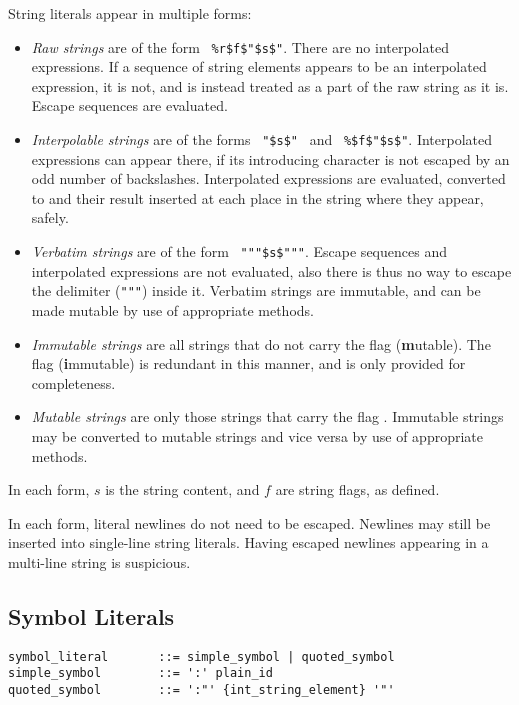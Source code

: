 String literals appear in multiple forms:
\begin{itemize}
  \item {\em Raw strings} are of the form ~\lstinline!%r$f$"$s$"!. There are no interpolated expressions. If a sequence of string elements appears to be an interpolated expression, it is not, and is instead treated as a part of the raw string as it is. Escape sequences are evaluated. 
  \item {\em Interpolable strings} are of the forms ~\lstinline!"$s$"!~ and ~\lstinline!%$f$"$s$"!. Interpolated expressions can appear there, if its introducing character is not escaped by an odd number of backslashes. Interpolated expressions are evaluated, converted to  and their result inserted at each place in the string where they appear, safely. 
  \item {\em Verbatim strings} are of the form ~\lstinline!"""$s$"""!. Escape sequences and interpolated expressions are not evaluated, also there is thus no way to escape the delimiter (\lstinline!"""!) inside it. Verbatim strings are immutable, and can be made mutable by use of appropriate methods. 
  \item {\em Immutable strings} are all strings that do not carry the flag  (\textbf{m}utable). The flag  (\textbf{i}mmutable) is redundant in this manner, and is only provided for completeness. 
  \item {\em Mutable strings} are only those strings that carry the flag . Immutable strings may be converted to mutable strings and vice versa by use of appropriate methods. 
\end{itemize}

In each form, $s$ is the string content, and $f$ are string flags, as defined. 

In each form, literal newlines do not need to be escaped. Newlines may still be inserted into single-line string literals. Having escaped newlines appearing in a multi-line string is suspicious. 





\subsection{Symbol Literals}
\label{sec:symbolliterals}

\syntax\begin{lstlisting}
symbol_literal       ::= simple_symbol | quoted_symbol
simple_symbol        ::= ':' plain_id
quoted_symbol        ::= ':"' {int_string_element} '"'
\end{lstlisting}

